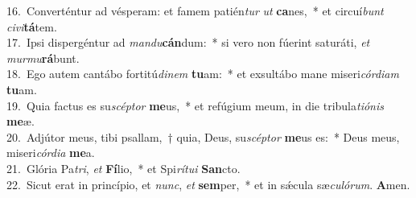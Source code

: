 {16.~}Converténtur ad vésperam: et famem patién\textit{tur} \textit{ut} \textbf{ca}nes,~* et circuí\textit{bunt} \textit{ci}\textit{vi}\textbf{tá}tem.\\
{17.~}Ipsi dispergéntur ad \textit{man}\textit{du}\textbf{cán}dum:~* si vero non fúerint saturáti, \textit{et} \textit{mur}\textit{mu}\textbf{rá}bunt.\\
{18.~}Ego autem cantábo fortitú\textit{di}\textit{nem} \textbf{tu}am:~* et exsultábo mane miseri\textit{cór}\textit{di}\textit{am} \textbf{tu}am.\\
{19.~}Quia factus es su\textit{scép}\textit{tor} \textbf{me}us,~* et refúgium meum, in die tribula\textit{ti}\textit{ó}\textit{nis} \textbf{me}æ.\\
{20.~}Adjútor meus, tibi psallam,~† quia, Deus, su\textit{scép}\textit{tor} \textbf{me}us es:~* Deus meus, miseri\textit{cór}\textit{di}\textit{a} \textbf{me}a.\\
{21.~}Glória Pa\textit{tri}, \textit{et} \textbf{Fí}lio,~* et Spi\textit{rí}\textit{tu}\textit{i} \textbf{San}cto.\\
{22.~}Sicut erat in princípio, et \textit{nunc}, \textit{et} \textbf{sem}per,~* et in sǽcula sæ\textit{cu}\textit{ló}\textit{rum}. \textbf{A}men.\\
